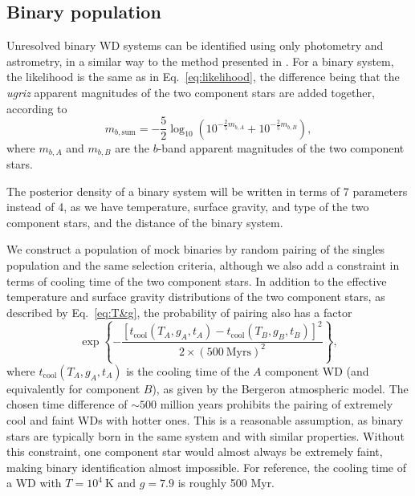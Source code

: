 \documentclass[fleqn,usenatbib]{mnras}
\newcommand{\Teff}{T}
\newcommand{\logg}{g}
\newcommand{\K}{\text{K}}
\begin{document}
\subsection{Binary population}

Unresolved binary WD systems can be identified using only photometry and astrometry, in a similar way to the method presented in \cite{2018ApJ...857..114W}. For a binary system, the likelihood is the same as in Eq.~\eqref{eq:likelihood}, the difference being that the \emph{ugriz} apparent magnitudes of the two component stars are added together, according to
\begin{equation}
	m_{b,\text{sum}} = - \frac{5}{2}\log_{10}\left( 10^{-\frac{2}{5}m_{b,A}}+10^{-\frac{2}{5}m_{b,B}}  \right),
\end{equation}
where $m_{b,A}$ and $m_{b,B}$ are the $b$-band apparent magnitudes of the two component stars.

The posterior density of a binary system will be written in terms of 7 parameters instead of 4, as we have temperature, surface gravity, and type of the two component stars, and the distance of the binary system.

We construct a population of mock binaries by random pairing of the singles population and the same selection criteria, although we also add a constraint in terms of cooling time of the two component stars. In addition to the effective temperature and surface gravity distributions of the two component stars, as described by Eq.~\eqref{eq:T&g}, the probability of pairing also has a factor
\begin{equation}\label{eq:time_difference}
	\exp\left\{
	-\frac{[t_\text{cool}(\Teff_A,\logg_A,t_A)-t_\text{cool}(\Teff_B,\logg_B,t_B)]^2}{2\times ( 500~\text{Myrs})^2}
	\right\},
\end{equation}
where $t_\text{cool}(\Teff_A,\logg_A,t_A)$ is the cooling time of the $A$ component WD (and equivalently for component $B$), as given by the Bergeron atmospheric model. The chosen time difference of $\sim 500$ million years prohibits the pairing of extremely cool and faint WDs with hotter ones. This is a reasonable assumption, as binary stars are typically born in the same system and with similar properties. Without this constraint, one component star would almost always be extremely faint, making binary identification almost impossible. For reference, the cooling time of a WD with $\Teff=10^4~\K$ and $\logg=7.9$ is roughly 500 Myr.
\end{document}
